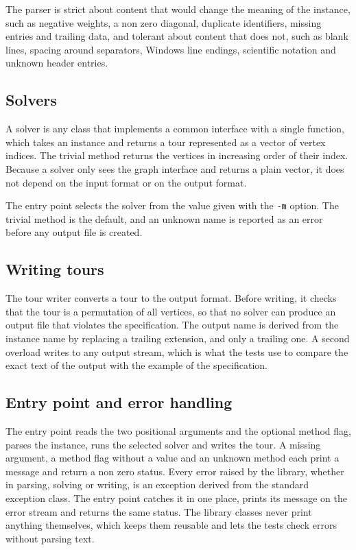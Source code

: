 \documentclass[11pt,a4paper]{article}
\begin{document}
The parser is strict about content that would change the meaning of the instance, such as negative weights, a non zero diagonal, duplicate identifiers, missing entries and trailing data, and tolerant about content that does not, such as blank lines, spacing around separators, Windows line endings, scientific notation and unknown header entries.

\subsection{Solvers}

A solver is any class that implements a common interface with a single function, which takes an instance and returns a tour represented as a vector of vertex indices. The trivial method returns the vertices in increasing order of their index. Because a solver only sees the graph interface and returns a plain vector, it does not depend on the input format or on the output format.

The entry point selects the solver from the value given with the \texttt{-m} option. The trivial method is the default, and an unknown name is reported as an error before any output file is created.

\subsection{Writing tours}

The tour writer converts a tour to the output format. Before writing, it checks that the tour is a permutation of all vertices, so that no solver can produce an output file that violates the specification. The output name is derived from the instance name by replacing a trailing extension, and only a trailing one. A second overload writes to any output stream, which is what the tests use to compare the exact text of the output with the example of the specification.

\subsection{Entry point and error handling}

The entry point reads the two positional arguments and the optional method flag, parses the instance, runs the selected solver and writes the tour. A missing argument, a method flag without a value and an unknown method each print a message and return a non zero status. Every error raised by the library, whether in parsing, solving or writing, is an exception derived from the standard exception class. The entry point catches it in one place, prints its message on the error stream and returns the same status. The library classes never print anything themselves, which keeps them reusable and lets the tests check errors without parsing text.
\end{document}
